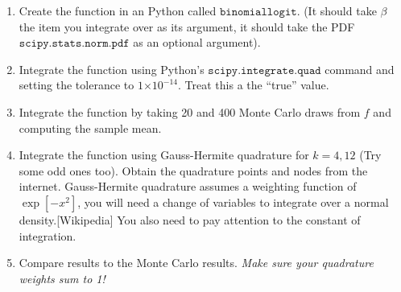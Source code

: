 \documentclass{article}
\providecommand{\e}[1]{\ensuremath{\times 10^{#1}}}
\begin{document}
\begin{enumerate}
\item Create the function in an Python called $\mathtt{binomiallogit}$. (It should take $\beta$ the item you integrate over as its argument, it should take the PDF $\mathtt{scipy.stats.norm.pdf}$ as an optional argument).

\item Integrate the function using Python's $\mathtt{scipy.integrate.quad}$ command and setting the tolerance to $1\e{-14}$.  Treat this a the ``true'' value.
\begin{comment}
\begin{verbatim}
[Ftrue,nevals]=quad(@binomiallogit,-10,10,1e-14);
z=randn(100,1);
Fmc=sum(binomiallogitnopdf(z))./length(z);
Fgh=binomiallogitnopdf(x)'*(w./sum(w));
\end{verbatim}
\end{comment}

\item Integrate the function by taking 20 and 400 Monte Carlo draws from $f$ and computing the sample mean.
\item Integrate the function using Gauss-Hermite quadrature for $k=4, 12$ (Try some odd ones too). Obtain the quadrature points and nodes from the internet. Gauss-Hermite quadrature assumes a weighting function of $\exp[-x^2]$, you will need a change of variables to integrate over a normal density.[Wikipedia] You also need to pay attention to the constant of integration.
\item Compare results to the Monte Carlo results. \textit{Make sure your quadrature weights sum to 1!}
\begin{comment}
\begin{table}[htdp]
\caption{True value: 0.5515}
\begin{center}
\begin{tabular}{l r r r }
Method & Points & Error\\
quad & 2597 & 1e-14 \\
monte carlo & 100 & 0.0166\\
Gauss Hermite & 4 & 0.0044234\\
Gauss Hermite & 12 & 0.0044469\\
\end{tabular}
\end{center}
\end{table}
\end{comment}


\end{enumerate}
\end{document}
